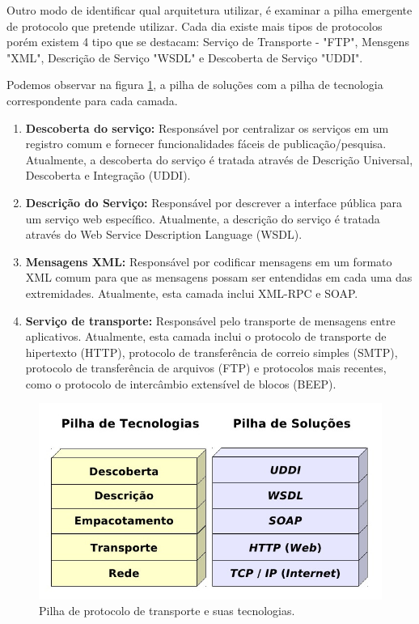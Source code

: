 \documentclass[12pt]{article}
\begin{document}
Outro modo de identificar qual arquitetura utilizar, é examinar a pilha emergente de protocolo que pretende utilizar. Cada dia existe mais tipos de protocolos porém existem 4 tipo que se destacam: Serviço de Transporte - "FTP", Mensgens "XML", Descrição de Serviço "WSDL"  e Descoberta de Serviço "UDDI".

	Podemos observar na figura \ref{wbss}, a pilha de soluções com a pilha de tecnologia correspondente para cada camada. 
\begin{enumerate}
	\item \textbf{Descoberta do serviço:}
	Responsável por centralizar os serviços em um registro comum e fornecer funcionalidades fáceis de publicação/pesquisa. Atualmente, a descoberta do serviço é tratada através de Descrição Universal, Descoberta e Integração (UDDI).
	\item \textbf{Descrição do Serviço:}
	Responsável por descrever a interface pública para um serviço web específico. Atualmente, a descrição do serviço é tratada através do Web Service Description Language (WSDL).
	\item \textbf{Mensagens XML:}
	Responsável por codificar mensagens em um formato XML comum para que as mensagens possam ser entendidas em cada uma das extremidades. Atualmente, esta camada inclui XML-RPC e SOAP.
	\item \textbf{Serviço de transporte:}
	 Responsável pelo transporte de mensagens entre aplicativos. Atualmente, esta camada inclui o protocolo de transporte de hipertexto (HTTP), protocolo de transferência de correio simples (SMTP), protocolo de transferência de arquivos (FTP) e protocolos mais recentes, como o protocolo de intercâmbio extensível de blocos (BEEP).


\end{enumerate}
\begin{figure}[H]
	\centering
	\includegraphics[scale=0.5]{Imagens/pilhat.jpg}
	\caption{Pilha de protocolo de transporte e suas tecnologias. }
	\label{wbss}
\end{figure}
\end{document}
